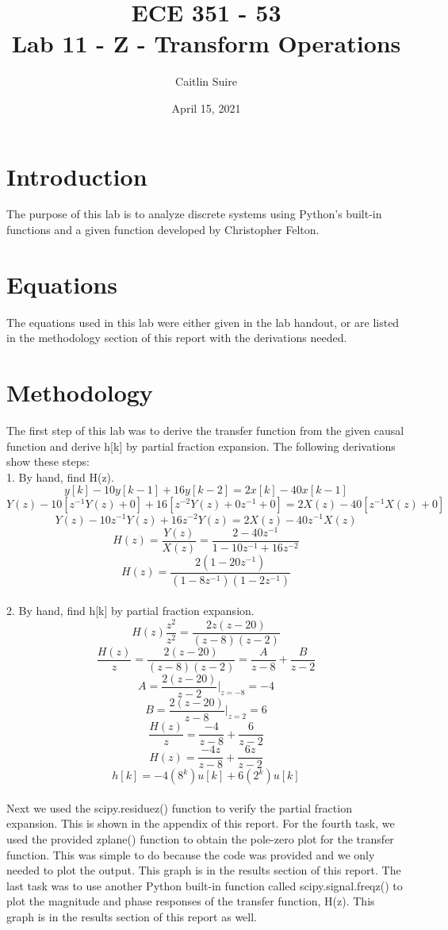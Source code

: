 \documentclass[12pt]{report}
\title{\myfont \textbf{ ECE 351 - 53 \\ \bigskip Lab 11 - Z - Transform Operations}}
\author{Caitlin Suire}
\date{April 15, 2021}
\begin{document}
\maketitle

\thispagestyle{empty}

\newpage

\tableofcontents
\pagebreak


\section{Introduction}
The purpose of this lab is to analyze discrete systems using Python's built-in functions and a given function developed by Christopher Felton. 

\section{Equations}
The equations used in this lab were either given in the lab handout, or are listed in the methodology section of this report with the derivations needed. 

\section{Methodology}
The first step of this lab was to derive the transfer function from the given causal function and derive h[k] by partial fraction expansion. The following derivations show these steps: \\

1. By hand, find H(z).
\[ y[k] - 10y[k-1] + 16y[k-2] = 2x[k] - 40x[k-1]  \] 
\[ Y(z) - 10[z^{-1}Y(z) + 0] + 16[z^{-2}Y(z) + 0z^{-1} + 0] = 2X(z) - 40[z^{-1}X(z) + 0] \] 
\[ Y(z) - 10z^{-1}Y(z) + 16z^{-2}Y(z) = 2X(z) - 40z^{-1}X(z) \]
\[ H(z) = \frac{Y(z)}{X(z)} = \frac{2 - 40z^{-1}}{1 - 10z^{-1} + 16z^{-2}} \] 
\[ H(z) = \frac{2(1-20z^{-1})}{(1-8z^{-1})(1-2z^{-1})} \] \\

2. By hand, find h[k] by partial fraction expansion.
\[ H(z)\frac{z^2}{z^2} = \frac{2z(z-20)}{(z-8)(z-2)} \]
\[ \frac{H(z)}{z} = \frac{2(z-20)}{(z-8)(z-2)} = \frac{A}{z-8} + \frac{B}{z-2} \]
\[ A = \frac{2(z-20)}{z-2} |_{z=-8} = -4 \] 
\[ B = \frac{2(z-20)}{z-8} |_{z=2} = 6 \]
\[ \frac{H(z)}{z} = \frac{-4}{z-8} + \frac{6}{z-2} \]
\[ H(z) = \frac{-4z}{z-8} + \frac{6z}{z-2} \]
\[ h[k] = -4(8^k) u[k] + 6(2^k) u[k] \]\\


\noindent Next we used the scipy.residuez() function to verify the partial fraction expansion. This is shown in the appendix of this report. For the fourth task, we used the provided zplane() function to obtain the pole-zero plot for the transfer function. This was simple to do because the code was provided and we only needed to plot the output. This graph is in the results section of this report. The last task was to use another Python built-in function called scipy.signal.freqz() to plot the magnitude and phase responses of the transfer function, H(z). This graph is in the results section of this report as well. 
\end{document}
